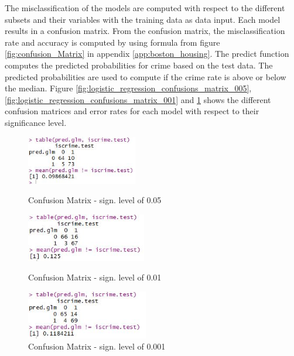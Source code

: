 The misclassification of the models are computed with respect to the different subsets and their variables with the training data as data input. Each model results in a confusion matrix. From the confusion matrix, the misclassification rate and accuracy is computed by using formula from figure \ref{fig:confusion_Matrix} in appendix \ref{app:boston_housing}. The predict function computes the predicted probabilities for crime based on the test data. The predicted probabilities are used to compute if the crime rate is above or below the median. Figure \ref{fig:logistic_regression_confusions_matrix_005}, \ref{fig:logistic_regression_confusions_matrix_001} and \ref{fig:logistic_regression_confusions_matrix_0001} shows the different confusion matrices and error rates for each model with respect to their significance level.  \\

\begin{figure}[H]
\centering
\begin{minipage}{0.32\textwidth}
\centering
    \includegraphics[width=\linewidth, height= 60pt]{Graphics/Assignment1/LogisticRegressionConfusionsMatrix.JPG}
    \caption{Confusion Matrix - sign. level of 0.05}
    \label{fig:logistic_regression_confusions_matrix_005}
\end{minipage}\hfill
\begin{minipage}{0.32\textwidth}
\centering

\includegraphics[width=\linewidth, height= 60pt]{Graphics/Assignment1/LogisticRegressionConfusionsMatrix_001.JPG}
    \caption{Confusion Matrix - sign. level of 0.01}
    \label{fig:logistic_regression_confusions_matrix_001}
\end{minipage}\hfill
\begin{minipage}{0.32\textwidth}
\centering

\includegraphics[width=\linewidth, height= 60pt]{Graphics/Assignment1/LogisticRegressionConfusionsMatrix_0001.JPG}
    \caption{Confusion Matrix - sign. level of 0.001}
    \label{fig:logistic_regression_confusions_matrix_0001}
\end{minipage}
\end{figure}


